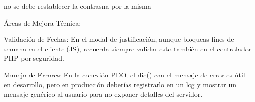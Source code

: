 no se debe restablecer la contrasna por la misma

Áreas de Mejora Técnica:

Validación de Fechas: En el modal de justificación, aunque bloqueas fines de semana en el cliente (JS),
 recuerda siempre validar esto también en el controlador PHP por seguridad.

Manejo de Errores: En la conexión PDO, el die() con el mensaje de error es útil en desarrollo,
 pero en producción deberías registrarlo en un log y mostrar un mensaje genérico al usuario para no exponer detalles del servidor.